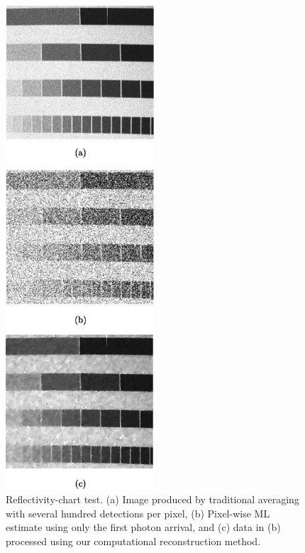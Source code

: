 \begin{figure}[h!]
\centerline{\includegraphics[height=18cm]{figure-first-intensitychart.pdf}}
\caption{Reflectivity-chart test. (a) Image produced by traditional averaging with several hundred detections per pixel, (b) Pixel-wise ML estimate using only the first photon arrival, and (c) data in (b) processed using our computational reconstruction method.}
\label{figure:first-intensitychart}
\end{figure}


